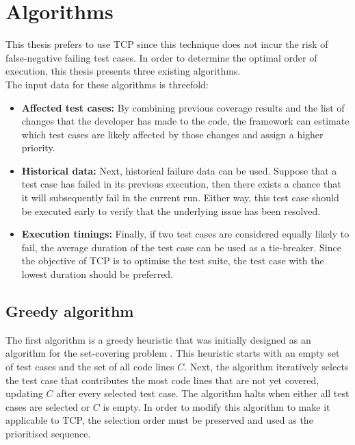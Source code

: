 \section{Algorithms}
\noindent This thesis prefers to use TCP since this technique does not incur the risk of false-negative failing test cases. In order to determine the optimal order of execution, this thesis presents three existing algorithms.\\

\noindent The input data for these algorithms is threefold:\\

\begin{itemize}
\item \textbf{Affected test cases:} By combining previous coverage results and the list of changes that the developer has made to the code, the framework can estimate which test cases are likely affected by those changes and assign a higher priority.

\item \textbf{Historical data:} Next, historical failure data can be used. Suppose that a test case has failed in its previous execution, then there exists a chance that it will subsequently fail in the current run. Either way, this test case should be executed early to verify that the underlying issue has been resolved.

\item \textbf{Execution timings:} Finally, if two test cases are considered equally likely to fail, the average duration of the test case can be used as a tie-breaker. Since the objective of TCP is to optimise the test suite, the test case with the lowest duration should be preferred.
\end{itemize}

\subsection{Greedy algorithm}
\noindent The first algorithm is a greedy heuristic that was initially designed as an algorithm for the set-covering problem \cite{evaluationoftestsuiteminimization}. This heuristic starts with an empty set of test cases and the set of all code lines $C$. Next, the algorithm iteratively selects the test case that contributes the most code lines that are not yet covered, updating $C$ after every selected test case. The algorithm halts when either all test cases are selected or $C$ is empty. In order to modify this algorithm to make it applicable to TCP, the selection order must be preserved and used as the prioritised sequence.

